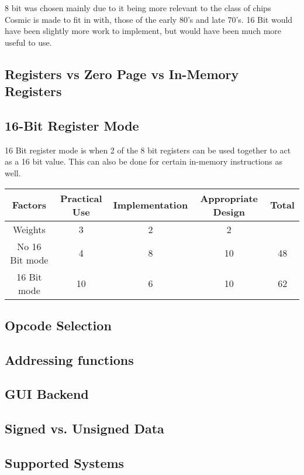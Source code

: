 \documentclass[conference]{IEEEtran}
\begin{document}
8 bit was chosen mainly due to it being more relevant to the class of chips Cosmic is made to fit in with, those of the early 80's and late 70's. 16 Bit would have been slightly more work to implement, but would have been much more useful to use.

\subsection{Registers vs Zero Page vs In-Memory Registers}

\subsection{16-Bit Register Mode}
16 Bit register mode is when 2 of the 8 bit registers can be used together to act as a 16 bit value. This can also be done for certain in-memory instructions as well. 

\begin{center}
 \begin{tabular}{||c|c|c|c|c||}
 \hline
 Factors & Practical Use & Implementation & Appropriate Design & \cellcolor{blue!40}Total\\ [0.5ex] 
 \hline\hline
 Weights & 3 & 2 & 2& \\ 
 \hline
 No 16 Bit mode & 4 &  8&  10 & \cellcolor{blue!25}48\\
 \hline
 16 Bit mode &  10 & 6 &  10 & \cellcolor{blue!25}62\\
 \hline
\end{tabular}
\end{center}



\subsection{Opcode Selection}
\subsection{Addressing functions}
\subsection{GUI Backend}
\subsection{Signed vs. Unsigned Data}
\subsection{Supported Systems}
\end{document}
